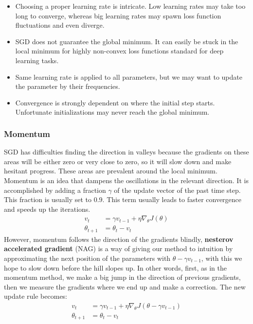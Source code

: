 \documentclass[a4paper, nobind]{templates/ociamthesis}
\begin{document}
\begin{itemize}
  \item Choosing a proper learning rate is intricate. Low learning rates may take too long to converge, whereas big learning rates may spawn loss function fluctuations and even diverge.
  \item SGD does not guarantee the global minimum. It can easily be stuck in the local minimum for highly non-convex loss functions standard for deep learning tasks.
  \item Same learning rate is applied to all parameters, but we may want to update the parameter by their frequencies.
  \item Convergence is strongly dependent on where the initial step starts. Unfortunate initializations may never reach the global minimum. 
\end{itemize}

\hypertarget{momentum}{%
\subsubsection{Momentum}\label{momentum}}

\noindent SGD has difficulties finding the direction in valleys because the gradients on these areas will be either zero or very close to zero, so it will slow down and make hesitant progress. These areas are prevalent around the local minimum. Momentum is an idea that dampens the oscillations in the relevant direction. It is accomplished by adding a fraction \(\gamma\) of the update vector of the past time step. This fraction is usually set to \(0.9\). This term usually leads to faster convergence and speeds up the iterations.
\[
\begin{aligned}
v_{t} &=\gamma v_{t-1}+\eta \nabla_{\theta} J(\theta) \\
\theta_{t+1} &=\theta_t-v_{t}
\end{aligned}
\]
However, momentum follows the direction of the gradients blindly, \textbf{nesterov accelerated gradient} (NAG) is a way of giving our method to intuition by approximating the next position of the parameters with \(\theta -\gamma v_{t-1}\), with this we hope to slow down before the hill slopes up. In other words, first, as in the momentum method, we make a big jump in the direction of previous gradients, then we measure the gradients where we end up and make a correction. The new update rule becomes:
\[
\begin{aligned} v_{t} &=\gamma v_{t-1}+\eta \nabla_{\theta} J\left(\theta-\gamma v_{t-1}\right) \\ 
\theta_{t+1} &=\theta_t-v_{t} \end{aligned}
\]
\end{document}
